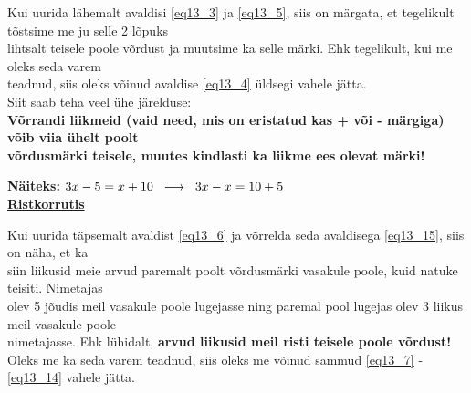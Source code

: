 \begin{center}
{{{\begin{flushleft}
\vspace{2mm}
\hspace{5mm} Kui uurida lähemalt avaldisi \ref{eq13_3} ja \ref{eq13_5}, siis on märgata, et tegelikult tõstsime me ju selle 2 lõpuks\\ \hspace{5mm} lihtsalt teisele poole võrdust ja muutsime ka selle märki. Ehk tegelikult, kui me oleks seda varem\\ \hspace{5mm} teadnud, siis oleks võinud avaldise \ref{eq13_4} üldsegi vahele jätta.\\
\vspace{2mm}
\hspace{5mm} Siit saab teha veel ühe järelduse:\\

\hspace{5mm} \textbf{Võrrandi liikmeid (vaid need, mis on eristatud kas + või - märgiga) võib viia ühelt poolt\\ \hspace{5mm} võrdusmärki teisele, muutes kindlasti ka liikme ees olevat märki!}

\vspace{2mm}
\hspace{5mm} \textbf{Näiteks:} $3x-5=x+10 \hspace{2mm} \longrightarrow \hspace{2mm} 3x-x=10+5$\\

\vspace{5mm}
\hspace{5mm} \textbf{\underline{Ristkorrutis}}

\vspace{2mm}
\hspace{5mm} 
Kui uurida täpsemalt avaldist \ref{eq13_6} ja võrrelda seda avaldisega \ref{eq13_15}, siis on näha, et ka\\ \hspace{5mm} siin liikusid meie arvud paremalt poolt võrdusmärki vasakule poole, kuid natuke teisiti. Nimetajas\\ \hspace{5mm} olev 5 jõudis meil vasakule poole lugejasse ning paremal pool lugejas olev 3 liikus meil vasakule poole\\ \hspace{5mm} nimetajasse. Ehk lühidalt, \textbf{arvud liikusid meil risti teisele poole võrdust!}\\
\vspace{2mm}
\hspace{5mm} Oleks me ka seda varem teadnud, siis oleks me võinud sammud \ref{eq13_7} - \ref{eq13_14} vahele jätta. 


\end{flushleft}}}}
\end{center}
